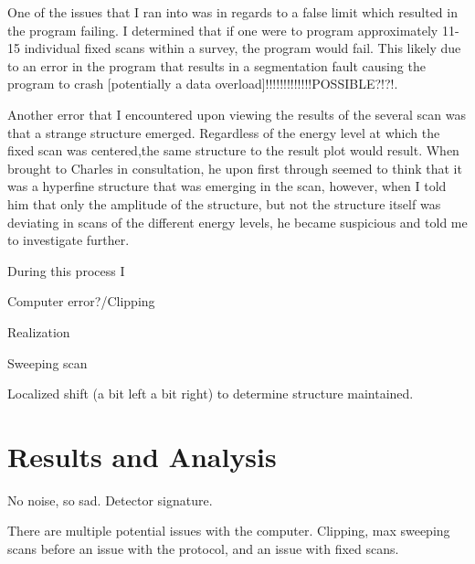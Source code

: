 \documentclass[twoside]{article}
\begin{document}
\begin{multicols}{2}
\vspace{5mm}

One of the issues that I ran into was in regards to a false limit which resulted in the program failing.  I determined that if one were to program approximately 11-15 individual fixed scans within a survey, the program would fail.  This likely due to an error in the program that results in a segmentation fault causing the program to crash [potentially a data overload]!!!!!!!!!!!!!POSSIBLE?!?!. %

\vspace{5mm}

Another error that I encountered upon viewing the results of the several scan was that a strange structure emerged.  Regardless of the energy level at which the fixed scan was centered,the same structure to the result plot would result.  When brought to Charles in consultation, he upon first through seemed to think that it was a hyperfine structure that was emerging in the scan, however, when I told him that only the amplitude of the structure, but not the structure itself was deviating in scans of the different energy levels, he became suspicious and told me to investigate further. 

\vspace{5mm}

During this process I 

\vspace{5mm}

Computer error?/Clipping

\vspace{5mm}

Realization

\vspace{5mm}

Sweeping scan

\vspace{5mm}

Localized shift (a bit left a bit right) to determine structure maintained.

\section{Results and Analysis}


No noise, so sad. Detector signature. 

\vspace{5mm}

There are multiple potential issues with the computer. Clipping, max sweeping scans before an issue with the protocol, and an issue with fixed scans.


\end{multicols}
\end{document}
